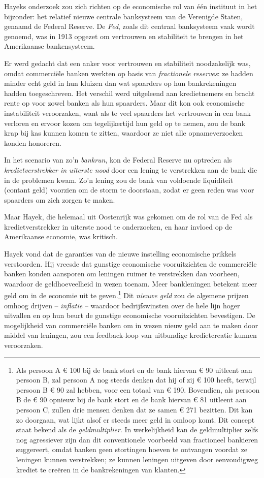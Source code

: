 \documentclass[
  a5paper,
  smalldemyvopaper,11pt,twoside,onecolumn,openright,extrafontsizes,
hidelinks]{memoir}
\begin{document}
Hayeks onderzoek zou zich richten op de economische rol van één
instituut in het bijzonder: het relatief nieuwe centrale banksysteem van
de Verenigde Staten, genaamd de Federal Reserve. De \emph{Fed}, zoals
dit centraal banksysteem vaak wordt genoemd, was in 1913 opgezet om
vertrouwen en stabiliteit te brengen in het Amerikaanse bankensysteem.

Er werd gedacht dat een anker voor vertrouwen en stabiliteit
noodzakelijk was, omdat commerciële banken werkten op basis van
\emph{fractionele reserves}: ze hadden minder echt geld in hun kluizen
dan wat spaarders op hun bankrekeningen hadden toegeschreven. Het
verschil werd uitgeleend aan kredietnemers en bracht rente op voor zowel
banken als hun spaarders. Maar dit kon ook economische instabiliteit
veroorzaken, want als te veel spaarders het vertrouwen in een bank
verloren en ervoor kozen om tegelijkertijd hun geld op te nemen, zou de
bank krap bij kas kunnen komen te zitten, waardoor ze niet alle
opnameverzoeken konden honoreren.

In het scenario van zo'n \emph{bankrun}, kon de Federal Reserve nu
optreden als \emph{kredietverstrekker in uiterste nood} door een lening
te verstrekken aan de bank die in de problemen kwam. Zo'n lening zou de
bank van voldoende liquiditeit (contant geld) voorzien om de storm te
doorstaan, zodat er geen reden was voor spaarders om zich zorgen te
maken.

Maar Hayek, die helemaal uit Oostenrijk was gekomen om de rol van de Fed
als kredietverstrekker in uiterste nood te onderzoeken, en haar invloed
op de Amerikaanse economie, was kritisch.

Hayek vond dat de garanties van de nieuwe instelling economische
prikkels verstoorden. Hij vreesde dat gunstige economische
vooruitzichten de commerciële banken konden aansporen om leningen ruimer
te verstrekken dan voorheen, waardoor de geldhoeveelheid in wezen
toenam. Meer bankleningen betekent meer geld om in de economie uit te
geven.\footnote{Als persoon A € 100 bij de bank stort en de bank hiervan
  € 90 uitleent aan persoon B, zal persoon A nog steeds denken dat hij
  of zij € 100 heeft, terwijl persoon B € 90 zal hebben, voor een totaal
  van € 190. Bovendien, als persoon B de € 90 opnieuw bij de bank stort
  en de bank hiervan € 81 uitleent aan persoon C, zullen drie mensen
  denken dat ze samen € 271 bezitten. Dit kan zo doorgaan, wat lijkt
  alsof er steeds meer geld in omloop komt. Dit concept staat bekend als
  de \emph{geldmultiplier}. In werkelijkheid kan de geldmultiplier zelfs
  nog agressiever zijn dan dit conventionele voorbeeld van fractioneel
  bankieren suggereert, omdat banken geen stortingen hoeven te ontvangen
  voordat ze leningen kunnen verstrekken; ze kunnen leningen uitgeven
  door eenvoudigweg krediet te creëren in de bankrekeningen van klanten.}
Dit \emph{nieuwe geld} zou de algemene prijzen omhoog drijven --
\emph{inflatie} -- waardoor bedrijfswinsten over de hele lijn hoger
uitvallen en op hun beurt de gunstige economische vooruitzichten
bevestigen. De mogelijkheid van commerciële banken om in wezen nieuw
geld aan te maken door middel van leningen, zou een feedback-loop van
uitbundige kredietcreatie kunnen veroorzaken.
\end{document}
